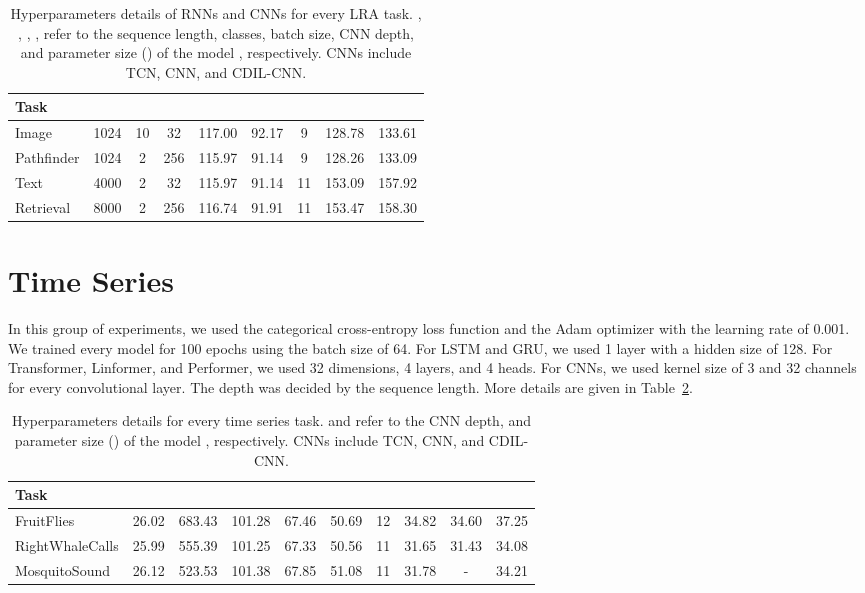 \documentclass{article}
\begin{document}
\begin{table}[bh]
\centering
\caption{Hyperparameters details of RNNs and CNNs for every LRA task. , , , ,  refer to the sequence length, classes, batch size, CNN depth, and parameter size () of the model , respectively. CNNs include TCN, CNN, and CDIL-CNN.}
\label{table:app_lra}
\renewcommand{\arraystretch}{1.2}
\begin{tabular}{lcccccccc}
\hline
\hline
Task         &      &      &    &    &    &    &    &\\
\hline
Image        &1024     &10    &32     &117.00     &92.17     &9     &128.78     &133.61     \\
\hline
Pathfinder   &1024     &2     &256    &115.97     &91.14     &9     &128.26     &133.09     \\
\hline
Text         &4000     &2     &32     &115.97     &91.14     &11    &153.09     &157.92     \\
\hline
Retrieval    &8000     &2     &256    &116.74     &91.91     &11    &153.47     &158.30     \\
\hline
\hline
\end{tabular}
\end{table}


\section{Time Series}
In this group of experiments, we used the categorical cross-entropy loss function and the Adam optimizer with the learning rate of 0.001. We trained every model for 100 epochs using the batch size of 64. For LSTM and GRU, we used 1 layer with a hidden size of 128. For Transformer, Linformer, and Performer, we used 32 dimensions, 4 layers, and 4 heads. For CNNs, we used kernel size of 3 and 32 channels for every convolutional layer. The depth was decided by the sequence length. More details are given in Table~\ref{table:app_time}.

\begin{table}[h]
\centering
\caption{Hyperparameters details for every time series task.  and  refer to the CNN depth, and parameter size () of the model , respectively. CNNs include TCN, CNN, and CDIL-CNN.}
\label{table:app_time}
\renewcommand{\arraystretch}{1.2}
\begin{tabular}{lccccccccc}
\hline
\hline
Task              &    &    &    &    &    &    &    &         &\\
\hline
FruitFlies        &26.02     &683.43     &101.28     &67.46     &50.69     &12     &34.82     &34.60     &37.25 \\
\hline
RightWhaleCalls   &25.99     &555.39     &101.25     &67.33     &50.56     &11     &31.65     &31.43     &34.08 \\
\hline
MosquitoSound     &26.12     &523.53     &101.38     &67.85     &51.08     &11     &31.78     & -     &34.21 \\
\hline
\hline
\end{tabular}
\end{table}
\end{document}
